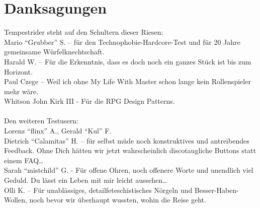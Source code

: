 \section{Danksagungen}
Tempestrider steht auf den Schultern dieser Riesen: \\
Mario "`Grubber"' S. -- für den Technophobie-Hardcore-Test und für 20 Jahre gemeinsame Würfelknechtschaft. \\
Harald W. -- Für die Erkenntnis, dass es doch noch ein ganzes Stück ist bis zum Horizont. \\
Paul Czege -- Weil ich ohne My Life With Master schon lange kein Rollenspieler mehr wäre. \\
Whitson John Kirk III - Für die RPG Design Patterns. \\
\\
Den weiteren Testusern: \\
Lorenz "`flinx"' A., Gerald "`Kul"' F. \\ 
Dietrich "`Calamitas"' H. -- für selbst müde noch konstruktives und antreibendes Feedback. Ohne Dich hätten wir jetzt wahrscheinlich discotaugliche Buttons statt einem FAQ\dots \\
Sarah "`mistchild"' G. - Für offene Ohren, noch offenere Worte und unendlich viel Geduld. Du lässt ein Leben mit mir leicht aussehen\dots \\
Olli K. -- Für unablässiges, detailfeteschistisches Nörgeln und Besser-Haben-Wollen, noch bevor wir überhaupt wussten, wohin die Reise geht.
